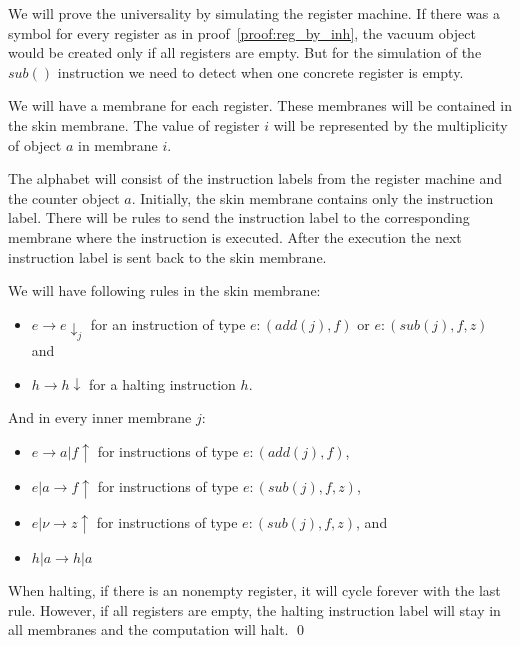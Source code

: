 \begin{dokaz}
  We will prove the universality by simulating the register machine. If there was a symbol for every register as in proof~\ref{proof:reg_by_inh}, the vacuum object would be created only if all registers are empty. But for the simulation of the $sub()$ instruction we need to detect when one concrete register is empty.
  
  We will have a membrane for each register. These membranes will be contained in the skin membrane. The value of register $i$ will be represented by the multiplicity of object $a$ in membrane $i$.
  
  The alphabet will consist of the instruction labels from the register machine and the counter object $a$. Initially, the skin membrane contains only the instruction label. There will be rules to send the instruction label to the corresponding membrane where the instruction is executed. After the execution the next instruction label is sent back to the skin membrane.
  
  We will have following rules in the skin membrane:
  
  \begin{itemize}
  \item $e \rightarrow e\downarrow_j$ for an instruction of type $e : (add(j), f)$ or $e : (sub(j), f, z)$ and
  \item $h \rightarrow h\downarrow$ for a halting instruction $h$.
  \end{itemize}
  
  And in every inner membrane $j$:
  
  \begin{itemize}
  \item $e \rightarrow a|f\uparrow$ for instructions of type $e : (add(j), f)$,
  \item $e|a \rightarrow f\uparrow$ for instructions of type $e : (sub(j), f, z)$,
  \item $e|\nu \rightarrow z\uparrow$ for instructions of type $e : (sub(j), f, z)$, and
  \item $h|a \rightarrow h|a$
  \end{itemize}

  When halting, if there is an nonempty register, it will cycle forever with the last rule. However, if all registers are empty, the halting instruction label will stay in all membranes and the computation will halt. \qed  
\end{dokaz}
